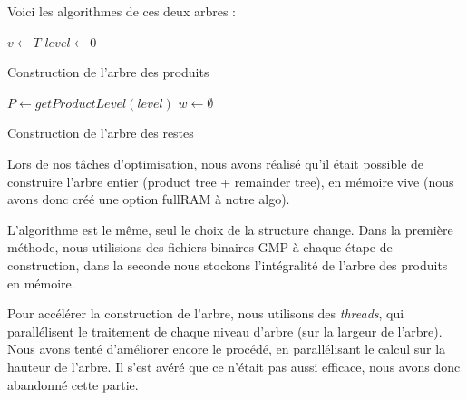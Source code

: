 \documentclass[a4paper,11pt,french]{article}
\begin{document}
Voici les algorithmes de ces deux arbres :

\begin{algorithm}[H]
\label{alg:productTree}
 $v \leftarrow T$\;
 $level \leftarrow 0$\;
 \caption{Construction de l'arbre des produits}
 
\end{algorithm}
\vspace{1cm}
\begin{algorithm}[H]
 \label{alg:remainderTree}
 $P \leftarrow getProductLevel(level)$\;
 $w \leftarrow \emptyset$\;
 \caption{Construction de l'arbre des restes}
\end{algorithm}


Lors de nos tâches d'optimisation, nous avons réalisé qu'il était possible de construire l'arbre entier (product tree + remainder tree), en mémoire vive (nous avons donc créé une option fullRAM à notre algo).

L'algorithme est le même, seul le choix de la structure change.
Dans la première méthode, nous utilisions des fichiers binaires GMP à chaque étape de construction, dans la  seconde nous stockons l'intégralité de l'arbre des produits en mémoire.

Pour accélérer la construction de l'arbre, nous utilisons des \textit{threads}, qui parallélisent le traitement de chaque niveau d'arbre (sur la largeur de l'arbre).
Nous avons tenté d'améliorer encore le procédé, en parallélisant le calcul sur la hauteur de l'arbre. Il s'est avéré que ce n'était pas aussi efficace, nous avons donc abandonné cette partie.
\end{document}
